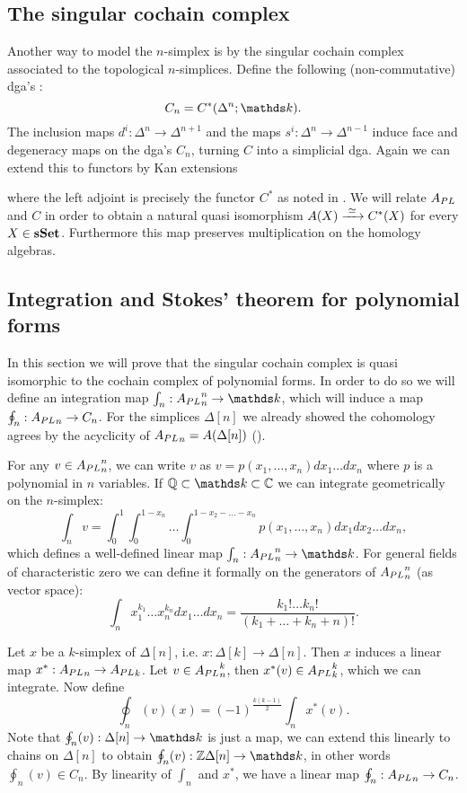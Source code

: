 \subsection{The singular cochain complex}

Another way to model the $n$-simplex is by the singular cochain complex associated to the topological $n$-simplices. Define the following (non-commutative) dga's :
$$ C_n = C^\ast(\Delta^n; \k). $$
The inclusion maps $d^i : \Delta^n \to \Delta^{n+1}$ and the maps $s^i: \Delta^n \to \Delta^{n-1}$ induce face and degeneracy maps on the dga's $C_n$, turning $C$ into a simplicial dga. Again we can extend this to functors by Kan extensions

where the left adjoint is precisely the functor $C^\ast$ as noted in \cite{felix}. We will relate ${A_{PL}}$ and $C$ in order to obtain a natural quasi isomorphism $A(X) \xrightarrow{\,\,{\simeq}\,\,} C^\ast(X)$ for every $X \in \mathbf{s{\mathbf{Set}}}$. Furthermore this map preserves multiplication on the homology algebras.


\subsection{Integration and Stokes' theorem for polynomial forms}

In this section we will prove that the singular cochain complex is quasi isomorphic to the cochain complex of polynomial forms. In order to do so we will define an integration map $\int_n : \Apl_n^n \to \k$, which will induce a map $\oint_n : {A_{PL}}_n \to C_n$. For the simplices $\Delta[n]$ we already showed the cohomology agrees by the acyclicity of ${A_{PL}}_n = A(\Delta[n])$ ().

For any $v \in {A_{PL}}_n^n$, we can write $v$ as $v = p(x_1, \dots, x_n)dx_1 \dots dx_n$ where $p$ is a polynomial in $n$ variables. If $\Q \subset \k \subset \mathbb{C}$ we can integrate geometrically on the $n$-simplex:
$$ \int_n v = \int_0^1 \int_0^{1-x_n} \dots \int_0^{1 - x_2 - \dots - x_n} p(x_1, \dots, x_n) dx_1 dx_2 \dots dx_n, $$
which defines a well-defined linear map $\int_n : \Apl_n^n \to \k$. For general fields of characteristic zero we can define it formally on the generators of ${A_{PL}}_n^n$ (as vector space):
$$ \int_n x_1^{k_1} \dots x_n^{k_n} dx_1 \dots dx_n = \frac{k_1! \dots k_n!}{(k_1 + \dots + k_n + n)!}. $$

Let $x$ be a $k$-simplex of $\Delta[n]$, i.e. $x: \Delta[k] \to \Delta[n]$. Then $x$ induces a linear map $x^\ast: {A_{PL}}_n \to {A_{PL}}_k$. Let $v \in {A_{PL}}_n^k$, then $x^\ast(v) \in {A_{PL}}_k^k$, which we can integrate. Now define
$$ \oint_n(v)(x) = (-1)^\frac{k(k-1)}{2} \int_n x^\ast(v). $$
Note that $\oint_n(v): \Delta[n] \to \k$ is just a map, we can extend this linearly to chains on $\Delta[n]$ to obtain $\oint_n(v): \Z\Delta[n] \to \k$, in other words $\oint_n(v) \in C_n$. By linearity of $\int_n$ and $x^\ast$, we have a linear map $\oint_n: {A_{PL}}_n \to C_n$.

